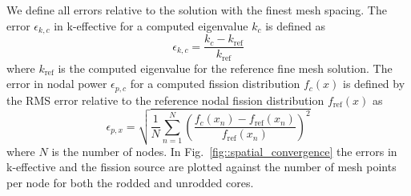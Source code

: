 \documentclass[12pt]{report}
\begin{document}
	We define all errors relative to the solution with the finest mesh spacing. The error $\epsilon_{k,c}$ in k-effective for a computed eigenvalue $k_c$ is defined as
	\begin{equation}
	\epsilon_{k,c} = \frac{k_c - k_\text{ref}}{k_\text{ref}}
	\end{equation}
	where $k_\text{ref}$ is the computed eigenvalue for the reference fine mesh solution. The error in nodal power $\epsilon_{p,c}$ for a computed fission distribution $f_c(x)$ is defined by the RMS error relative to the reference nodal fission distribution $f_\text{ref}(x)$ as
	\begin{equation}
	\epsilon_{p,x} = \sqrt{\frac{1}{N} \sum_{n=1}^N \left( \frac{f_c(x_n) - f_\text{ref}(x_n)}{f_\text{ref}(x_n)} \right)^2}
	\end{equation}
	where $N$ is the number of nodes. In Fig.~\ref{fig::spatial_convergence} the errors in k-effective and the fission source are plotted against the number of mesh points per node for both the rodded and unrodded cores. 
	
\end{document}
